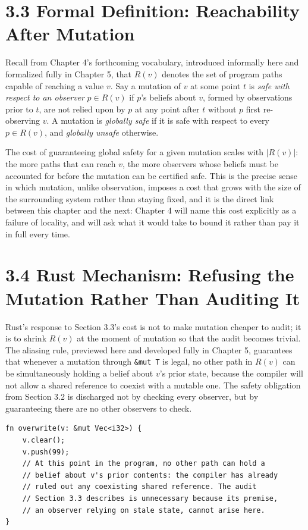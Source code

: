\documentclass[11pt]{book}
\begin{document}
\section*{3.3 Formal Definition: Reachability After Mutation}

Recall from Chapter 4's forthcoming vocabulary, introduced informally here and formalized fully in Chapter 5, that $R(v)$ denotes the set of program paths capable of reaching a value $v$. Say a mutation of $v$ at some point $t$ is \emph{safe with respect to an observer} $p \in R(v)$ if $p$'s beliefs about $v$, formed by observations prior to $t$, are not relied upon by $p$ at any point after $t$ without $p$ first re-observing $v$. A mutation is \emph{globally safe} if it is safe with respect to every $p \in R(v)$, and \emph{globally unsafe} otherwise.

The cost of guaranteeing global safety for a given mutation scales with $|R(v)|$: the more paths that can reach $v$, the more observers whose beliefs must be accounted for before the mutation can be certified safe. This is the precise sense in which mutation, unlike observation, imposes a cost that grows with the size of the surrounding system rather than staying fixed, and it is the direct link between this chapter and the next: Chapter 4 will name this cost explicitly as a failure of locality, and will ask what it would take to bound it rather than pay it in full every time.

\section*{3.4 Rust Mechanism: Refusing the Mutation Rather Than Auditing It}

Rust's response to Section 3.3's cost is not to make mutation cheaper to audit; it is to shrink $R(v)$ at the moment of mutation so that the audit becomes trivial. The aliasing rule, previewed here and developed fully in Chapter 5, guarantees that whenever a mutation through \texttt{\&mut T} is legal, no other path in $R(v)$ can be simultaneously holding a belief about $v$'s prior state, because the compiler will not allow a shared reference to coexist with a mutable one. The safety obligation from Section 3.2 is discharged not by checking every observer, but by guaranteeing there are no other observers to check.

\begin{lstlisting}
fn overwrite(v: &mut Vec<i32>) {
    v.clear();
    v.push(99);
    // At this point in the program, no other path can hold a
    // belief about v's prior contents: the compiler has already
    // ruled out any coexisting shared reference. The audit
    // Section 3.3 describes is unnecessary because its premise,
    // an observer relying on stale state, cannot arise here.
}
\end{lstlisting}
\end{document}
